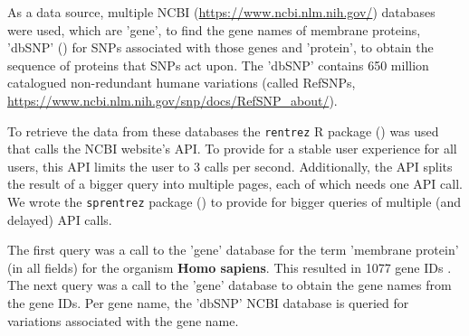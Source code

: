 
As a data source, multiple
NCBI (\url{https://www.ncbi.nlm.nih.gov/}) databases were used,
which are 'gene', to find the gene names of membrane proteins, 
'dbSNP' (\cite{sherry2001dbsnp}) for SNPs associated with those genes
and 'protein', to obtain the sequence of proteins that SNPs act upon.
The 'dbSNP' contains 650 million 
catalogued non-redundant humane variations (called RefSNPs,
\url{https://www.ncbi.nlm.nih.gov/snp/docs/RefSNP_about/}).


To retrieve the data from these databases the
\verb;rentrez; R package (\cite{rentrez}) was used
that calls the NCBI website's API. To provide for a 
stable user experience for all users, 
this API limits the user to 3 calls per second.
Additionally, the API splits the result of a bigger
query into multiple pages, each of which needs one API call.
We wrote the \verb;sprentrez; package (\cite{sprentrez}) to provide for 
bigger queries of multiple (and delayed) API calls.


The first query was a call to the 'gene' database for the 
term 'membrane protein' (in all fields) for the organism \textbf{Homo sapiens}.
This resulted in 1077 gene IDs
.
The next query was a call to the 'gene' database 
to obtain the gene names from the gene IDs.
Per gene name, the 'dbSNP' NCBI database is queried for 
variations associated with the gene name. 

